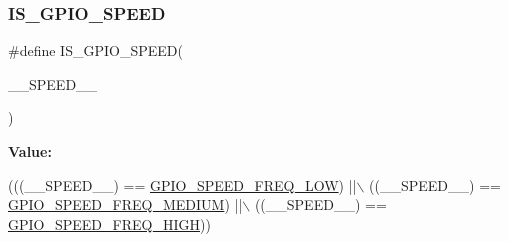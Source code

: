 \subsubsection{\texorpdfstring{I\+S\+\_\+\+G\+P\+I\+O\+\_\+\+S\+P\+E\+ED}{IS\_GPIO\_SPEED}}
{\footnotesize\ttfamily \#define I\+S\+\_\+\+G\+P\+I\+O\+\_\+\+S\+P\+E\+ED(\begin{DoxyParamCaption}\item[{}]{\+\_\+\+\_\+\+S\+P\+E\+E\+D\+\_\+\+\_\+ }\end{DoxyParamCaption})}

{\bfseries Value\+:}
\begin{DoxyCode}
(((\_\_SPEED\_\_) == \hyperlink{group___g_p_i_o__speed_gab7916c4265bfa1b26a5205ea9c1caa4e}{GPIO\_SPEED\_FREQ\_LOW})    ||\(\backslash\)
                                     ((\_\_SPEED\_\_) == \hyperlink{group___g_p_i_o__speed_ga1724a25a9cf00ebf485daeb09cfa1e25}{GPIO\_SPEED\_FREQ\_MEDIUM}) ||\(\backslash\)
                                     ((\_\_SPEED\_\_) == \hyperlink{group___g_p_i_o__speed_gaef5898db71cdb957cd41f940b0087af8}{GPIO\_SPEED\_FREQ\_HIGH}))
\end{DoxyCode}

